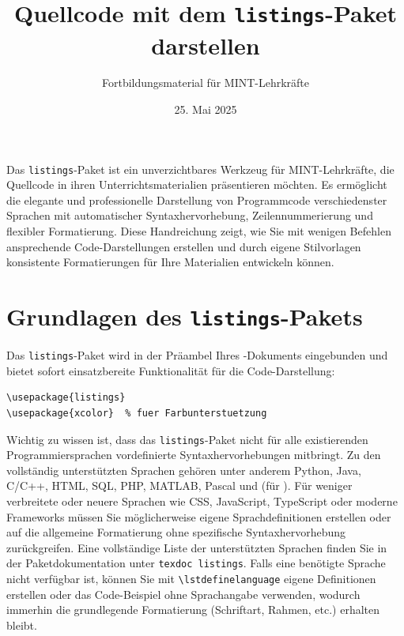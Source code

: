 



\title{Quellcode mit dem \texttt{listings}-Paket darstellen}
\author{Fortbildungsmaterial für MINT-Lehrkräfte}
\date{25. Mai 2025}
\pagestyle{plain}



\maketitle

Das \texttt{listings}-Paket ist ein unverzichtbares Werkzeug für MINT-Lehrkräfte, die Quellcode in ihren Unterrichtsmaterialien präsentieren möchten. Es ermöglicht die elegante und professionelle Darstellung von Programmcode verschiedenster Sprachen mit automatischer Syntaxhervorhebung, Zeilennummerierung und flexibler Formatierung. Diese Handreichung zeigt, wie Sie mit wenigen Befehlen ansprechende Code-Darstellungen erstellen und durch eigene Stilvorlagen konsistente Formatierungen für Ihre Materialien entwickeln können.



\section{Grundlagen des \texttt{listings}-Pakets}

Das \texttt{listings}-Paket wird in der Präambel Ihres -Dokuments eingebunden und bietet sofort einsatzbereite Funktionalität für die Code-Darstellung:

\begin{lstlisting}[style=latex]
\usepackage{listings}
\usepackage{xcolor}  % fuer Farbunterstuetzung
\end{lstlisting}

Wichtig zu wissen ist, dass das \texttt{listings}-Paket nicht für alle existierenden Programmiersprachen vordefinierte Syntaxhervorhebungen mitbringt. Zu den vollständig unterstützten Sprachen gehören unter anderem Python, Java, C/C++, HTML, SQL, PHP, MATLAB, Pascal und  (für ). Für weniger verbreitete oder neuere Sprachen wie CSS, JavaScript, TypeScript oder moderne Frameworks müssen Sie möglicherweise eigene Sprachdefinitionen erstellen oder auf die allgemeine Formatierung ohne spezifische Syntaxhervorhebung zurückgreifen. Eine vollständige Liste der unterstützten Sprachen finden Sie in der Paketdokumentation unter \texttt{texdoc listings}. Falls eine benötigte Sprache nicht verfügbar ist, können Sie mit \texttt{\textbackslash lstdefinelanguage} eigene Definitionen erstellen oder das Code-Beispiel ohne Sprachangabe verwenden, wodurch immerhin die grundlegende Formatierung (Schriftart, Rahmen, etc.) erhalten bleibt.

